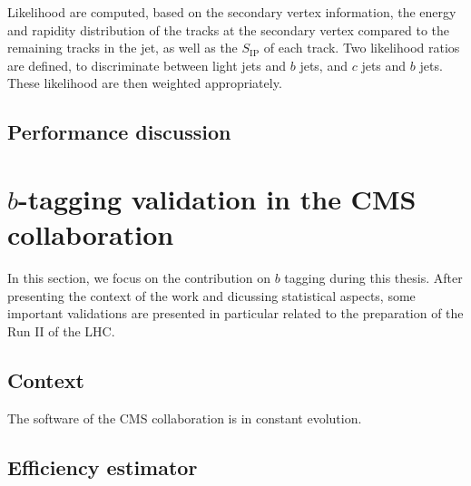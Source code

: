     Likelihood are computed, based on the secondary vertex information, the energy
    and rapidity distribution of the tracks at the secondary vertex compared to the remaining
    tracks in the jet, as well as the $S_\text{IP}$ of each track. Two likelihood ratios
    are defined, to discriminate between light jets and $b$ jets, and $c$ jets and $b$ jets.
    These likelihood are then weighted appropriately.


    \subsection{Performance discussion}


    \section{$b$-tagging validation in the CMS collaboration \label{sec:bTagValidation}}

    In this section, we focus on the contribution on $b$ tagging during this thesis.
    After presenting the context of the work and dicussing statistical aspects, some
    important validations are presented in particular related to the preparation of the
    Run II of the LHC.

        \subsection{Context}

    The software of the CMS collaboration is in constant evolution.

        \subsection{Efficiency estimator}

